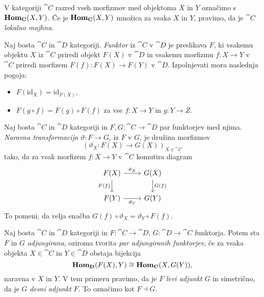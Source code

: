 \documentclass[../kategoricna_logika.tex]{subfiles}
\begin{document}
\begin{definicija}
  V kategoriji $\cat{C}$ razred vseh morfizmov med objektoma $X$ in $Y$ označimo s $\mathbf{Hom}_{{\operatorname{\mathbf{C}}}}(X,Y)$.
  Če je $\mathbf{Hom}_{{\operatorname{\mathbf{C}}}}(X,Y)$ množica za vsaka $X$ in $Y$, pravimo, da je $\cat{C}$
  \emph{lokalno majhna}.
\end{definicija}
\begin{definicija}
  Naj bosta $\cat{C}$ in $\cat{D}$ kategoriji. \emph{Funktor} iz $\cat{C}$ v $\cat{D}$
  je preslikava $F$, ki vsakemu objektu $X$ iz \(\cat{C}\) priredi objekt \(F(X)\) v $\cat{D}$
  in vsakemu morfizmu $f: X \to Y$ v $\cat{C}$ priredi morfizem $F(f): F(X) \to F(Y)$ v $\cat{D}$.
  Izpolnjevati mora naslednja pogoja:
  \begin{itemize}
  \item $F(\mathrm{id}_X) = \mathrm{id}_{F(X)}$,
  \item $F(g \circ f) = F(g) \circ F(f)$ za vse $f : X \to Y$ in $g : Y \to Z$.
  \end{itemize}
\end{definicija}
\begin{definicija}
  Naj bosta $\cat{C}$ in $\cat{D}$ kategoriji in $F,G : \cat{C} \to \cat{D}$ par funktorjev
  med njima. \emph{Naravna transformacija} $\vartheta : F \to G$, iz $F$ v $G$, je
  družina morfizmov
  \[ (\vartheta_X : F(X) \to G(X))_{X \in \cat{C}}\]
  tako, da za vsak morfizem $f : X \to Y$ v $\cat{C}$ komutira diagram
  \begin{equation*}
    \begin{tikzcd}
      F(X) \ar[d, "F(f)"'] \ar[r, "\vartheta_X"] & G(X) \ar[d, "G(f)"] \\
      F(Y) \ar[r, "\vartheta_Y"'] & G(Y)
    \end{tikzcd}
  \end{equation*}
  To pomeni, da velja enačba \( G(f) \circ \vartheta_X = \vartheta_Y \circ F(f)\).
\end{definicija}
\begin{definicija}
  Naj bosta $\cat{C}$ in $\cat{D}$ kategoriji in $F : \cat{C} \to \cat{D}$, $G : \cat{D} \to \cat{C}$
  funktorja. Potem sta $F$ in $G$ \emph{adjungirana}, oziroma tvorita
  \emph{par adjungiranih funktorjev}, če za vsaka objekta $X \in \cat{C}$ in $Y \in \cat{D}$
  obstaja bijekcija
  \[ \mathbf{Hom}_{{\operatorname{\mathbf{D}}}}(F(X), Y) \cong \mathbf{Hom}_{{\operatorname{\mathbf{C}}}}(X, G(Y)),\]
  naravna v $X$ in $Y$.
  V tem primeru pravimo, da je $F$ \emph{levi adjunkt} $G$ in simetrično, da je $G$
  \emph{desni adjunkt} $F$. To označimo kot $F \dashv G$.
\end{definicija}
\end{document}
